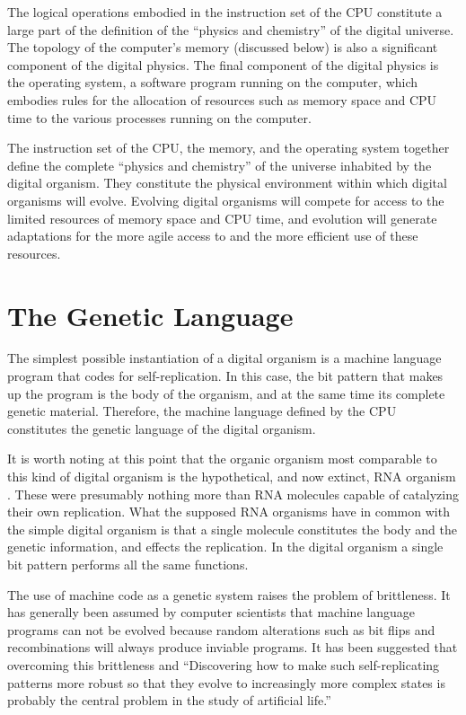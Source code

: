 The logical operations embodied in the instruction set of the CPU
constitute a large part of the definition of the ``physics and chemistry''
of the digital universe.  The topology of the computer's memory
(discussed below) is also a significant component of the digital
physics.  The final component of the digital physics is the operating
system, a software program running on the computer, which embodies
rules for the allocation of resources such as memory space and CPU
time to the various processes running on the computer.

The instruction set of the CPU, the memory, and the operating system
together define the complete ``physics and chemistry'' of the universe
inhabited by the digital organism.  They constitute the physical
environment within which digital organisms will evolve.  Evolving
digital organisms will compete for access to the limited resources of
memory space and CPU time, and evolution will generate adaptations for
the more agile access to and the more efficient use of these resources.

\section{The Genetic Language}

The simplest possible instantiation of a digital organism is a
machine language program that codes for self-replication.  In this
case, the bit pattern that makes up the program is the body of the
organism, and at the same time its complete genetic material.
Therefore, the machine language defined by the CPU constitutes the
genetic language of the digital organism.

It is worth noting at this point that the organic organism most
comparable to this kind of digital organism is the hypothetical,
and now extinct, RNA organism \cite{Benn}.  These were presumably nothing
more than RNA molecules capable of catalyzing their own replication.
What the supposed RNA organisms have in common with the simple
digital organism is that a single molecule constitutes the body
and the genetic information, and effects the replication.  In the
digital organism a single bit pattern performs all the same functions.

The use of machine code as a genetic system raises the problem of
brittleness.  It has generally been assumed by computer scientists
that machine language programs can not be evolved because random
alterations such as bit flips and recombinations will always produce
inviable programs.  It has been suggested \cite{FaBe} that overcoming
this brittleness and ``Discovering how to make such self-replicating
patterns more robust so that they evolve to increasingly more complex
states is probably the central problem in the study of artificial life.''

